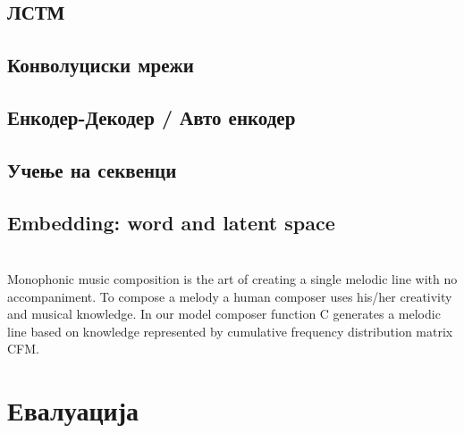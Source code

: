 \section{ЛСТМ}
 
\section{Конволуциски мрежи}
 
\section{Енкодер-Декодер / Авто енкодер}

\section{Учење на секвенци}

\section{Embedding: word and latent space}

\chapter{}
Monophonic music composition is the art of creating a single melodic line with no accompaniment. To compose a melody a human composer uses his/her creativity and musical knowledge. In our model composer function C generates a melodic line based on knowledge represented by cumulative frequency distribution matrix CFM.

\chapter{Евалуација}


